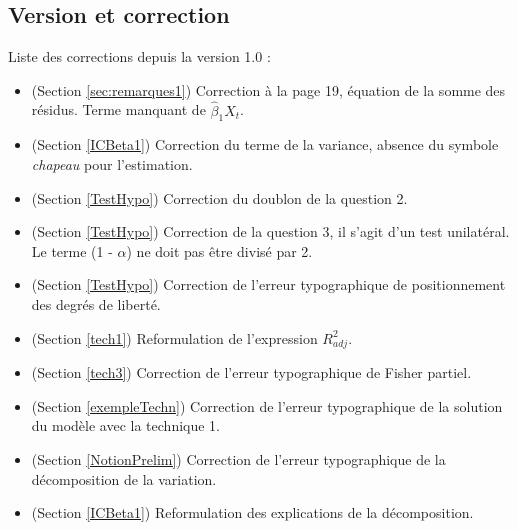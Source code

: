 \subsection*{Version et correction}
Liste des corrections depuis la version 1.0 :
\begin{itemize}
\item (Section \ref{sec:remarques1}) Correction à la page 19, équation de la somme des résidus. Terme manquant de $\hat{\beta}_1 X_t$.
\item (Section \ref{ICBeta1}) Correction du terme de la variance, absence du symbole \emph{chapeau} pour l'estimation. 
\item (Section \ref{TestHypo}) Correction du doublon de la question 2.
\item (Section \ref{TestHypo}) Correction de la question 3, il s'agit d'un test unilatéral. Le terme (1 - $\alpha$) ne doit pas être divisé par 2. 
\item (Section \ref{TestHypo}) Correction de l'erreur typographique de positionnement des degrés de liberté.
\item (Section \ref{tech1}) Reformulation de l'expression $R^2_{adj}$.
\item (Section \ref{tech3}) Correction de l'erreur typographique de Fisher partiel.
\item (Section \ref{exempleTechn}) Correction de l'erreur typographique de la solution du modèle avec la technique 1.
\item (Section \ref{NotionPrelim}) Correction de l'erreur typographique de la décomposition de la variation.
\item (Section \ref{ICBeta1}) Reformulation des explications de la décomposition.
\end{itemize}
